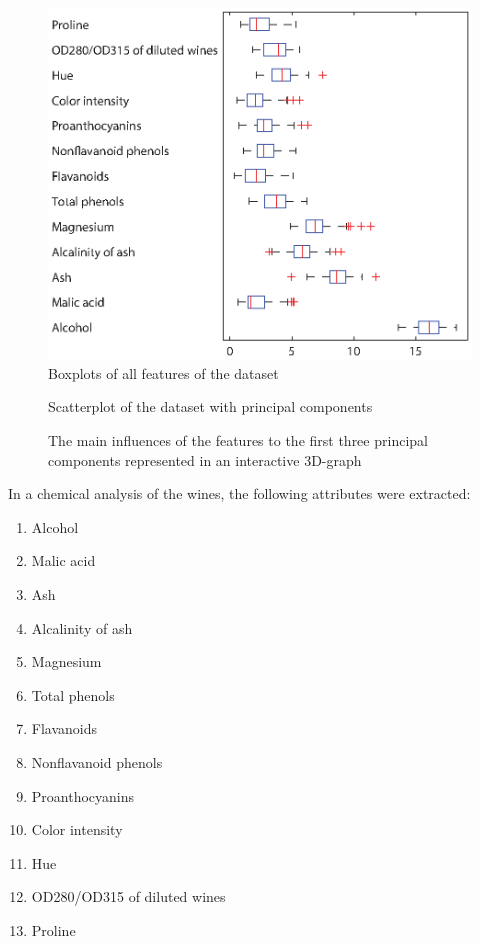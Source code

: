 \documentclass[a4paper,psfig,subfigure,epsfig,fleqn,amssmb,float,caption,fontenc,ausarbeitung]{article}
\begin{document}
	\begin{figure}
		\centering
			\includegraphics{img/boxplot.eps}
		\caption{Boxplots of all features of the dataset}
		\label{fig:boxes}
	\end{figure}

\begin{figure}
	\centering
	\newlength\figureheight 
	\newlength\figurewidth 
	\setlength\figureheight{7cm} 
	\setlength\figurewidth{9cm}
	
	\caption{Scatterplot of the dataset with principal components}
	\label{fig:scatter}
\end{figure}

\begin{figure}
	\centering
	\setlength\figureheight{10cm} 
	\setlength\figurewidth{10cm}
	
	\caption{The main influences of the features to the first three principal components represented in an interactive 3D-graph}
	\label{fig:inf}
\end{figure}

In a chemical analysis of the wines, the following attributes were extracted:

\begin{enumerate}
	\item Alcohol 
	\item Malic acid 
	\item Ash 
	\item Alcalinity of ash 
	\item Magnesium 
	\item Total phenols 
	\item Flavanoids 
	\item Nonflavanoid phenols 
	\item Proanthocyanins 
	\item Color intensity 
	\item Hue 
	\item OD280/OD315 of diluted wines 
	\item Proline 
\end{enumerate}
\end{document}
